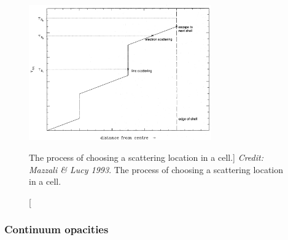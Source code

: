 \begin{figure}
\centering
\includegraphics[width=0.7\textwidth]{figures/03-radtrans/tau_scat.png}
\caption
[The process of choosing a scattering location in a cell.]
{
{\sl Credit: Mazzali \& Lucy 1993}. 
The process of choosing a scattering location in a cell.
} 
\label{fig:scatter_ml93}
\end{figure}

\subsubsection{Continuum opacities}

